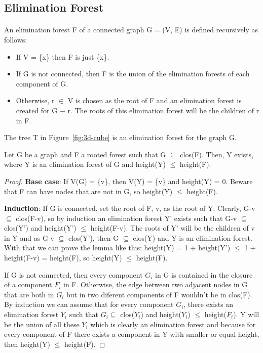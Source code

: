 \subsection{Elimination Forest}
\paragraph{}
An elimination forest F of a connected graph G = (V, E) is defined recursively as follows:
\begin{itemize}
  \item If V = \{x\} then F is just \{x\}.
  \item If G is not connected, then F is the union of the elimination forests of each component of G.
  \item Otherwise, r $\in$ V is chosen as the root of F and an elimination forest is created for G $-$ r. The roots of this elimination forest will be the children of r in F.
\end{itemize}
The tree T in Figure~\ref{fig:3d-cube} is an elimination forest for the graph G.

\begin{lemma}
\label{lema:min-ET}
Let G be a graph and F a rooted forest such that G $\subseteq$ clos(F). Then, Y exists, where Y is an elimination forest of G and height(Y) $\leq$ height(F).
\end{lemma}

\begin{proof}
  \item \textbf{Base case}: If V(G) = \{v\}, then V(Y) = \{v\} and height(Y) = 0. Beware that F can have nodes that are not in G, so height(Y) $\leq$ height(F).
  \item \textbf{Induction}: If G is connected, set the root of F, v, as the root of Y. Clearly, G-v $\subseteq$ clos(F-v), so by induction an elimination forest Y' exists such that G-v $\subseteq$ clos(Y') and height(Y') $\leq$ height(F-v). The roots of Y' will be the children of v in Y and as G-v $\subseteq$ clos(Y'), then G $\subseteq$ clos(Y) and Y is an elimination forest. With that we can prove the lemma like this: height(Y) = 1 + height(Y') $\leq$ 1 + height(F-v) = height(F), so height(Y) $\leq$ height(F).
  
  If G is not connected, then every component $G_i$ in G is contained in the closure of a component $F_i$ in F. Otherwise, the edge between two adjacent nodes in G that are both in $G_i$ but in two diferent components of F wouldn't be in clos(F). By induction we can assume that for every component $G_i$, there exists an elimination forest $Y_i$ such that $G_i \subseteq$ clos($Y_i$) and height($Y_i$) $\leq$ height($F_i$). Y will be the union of all these $Y_i$ which is clearly an elimination forest and because for every component of F there exists a component in Y with smaller or equal height, then height(Y) $\leq$ height(F).
\end{proof}

